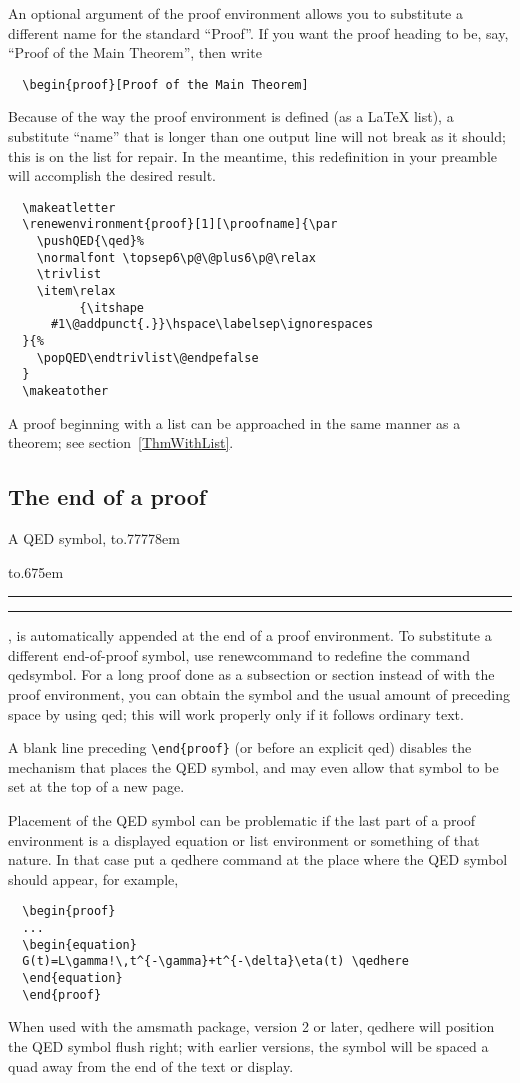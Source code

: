 \documentclass[11pt,twoside]{article}
\providecommand{\qq}[1]{\textquotedblleft#1\textquotedblright}
\newcommand{\ntt}{%
  \fontfamily\ttdefault \fontseries\mddefault \fontshape\updefault
  \selectfont
}
\DeclareRobustCommand{\cn}[1]{{\ntt\bslchar#1}}
\DeclareRobustCommand{\pkg}[1]{{\ntt#1}}
\DeclareRobustCommand{\env}[1]{{\ntt#1}}
\providecommand{\qedsymbol}{\leavevmode
  \hbox to.77778em{%
  \hfil\vrule
  \vbox to.675em{\hrule width.6em\vfil\hrule}%
  \vrule\hfil}}
\def\latex/{{\protect\LaTeX}}
\begin{document}
An optional argument of the proof environment allows you to substitute
a different name for the standard \qq{Proof\/}. If you want
the proof heading to be, say, \qq{Proof of the Main Theorem}, then write
\begin{verbatim}
  \begin{proof}[Proof of the Main Theorem]
\end{verbatim}

Because of the way the \env{proof} environment is defined (as a
\latex/ list), a substitute ``name'' that is longer than one output
line will not break as it should; this is on the list for repair.
In the meantime, this redefinition in your preamble will accomplish
the desired result.
\begin{verbatim}
  \makeatletter
  \renewenvironment{proof}[1][\proofname]{\par
    \pushQED{\qed}%
    \normalfont \topsep6\p@\@plus6\p@\relax
    \trivlist
    \item\relax
          {\itshape
      #1\@addpunct{.}}\hspace\labelsep\ignorespaces
  }{%
    \popQED\endtrivlist\@endpefalse
  }
  \makeatother
\end{verbatim}

A proof beginning with a list can be approached in the same manner
as a theorem; see section~\ref{ThmWithList}.

\subsection{The end of a proof}

A QED symbol, \qedsymbol, is automatically appended at the end of
a \env{proof} environment. To substitute a different end-of-proof
symbol, use \cn{renewcommand} to redefine the command \cn{qedsymbol}.
For a long proof done as a subsection or section instead of with the
\env{proof} environment, you can obtain the symbol and the usual
amount of preceding space by using \cn{qed}; this will work properly
only if it follows ordinary text.

A blank line preceding \verb+\end{proof}+ (or before an explicit \cn{qed})
disables the mechanism that places the QED symbol, and may even allow
that symbol to be set at the top of a new page.

Placement of the QED symbol can be problematic if the last part of
a \env{proof} environment is a displayed equation or list environment
or something of that nature. In that case put a \cn{qedhere} command at
the place where the QED symbol should appear, for example,
\begin{verbatim}
  \begin{proof}
  ...
  \begin{equation}
  G(t)=L\gamma!\,t^{-\gamma}+t^{-\delta}\eta(t) \qedhere
  \end{equation}
  \end{proof}
\end{verbatim}
When used with the \pkg{amsmath} package, version 2 or later, \cn{qedhere}
will position the QED symbol flush right; with earlier versions, the
symbol will be spaced a quad away from the end of the text or display.
\end{document}
